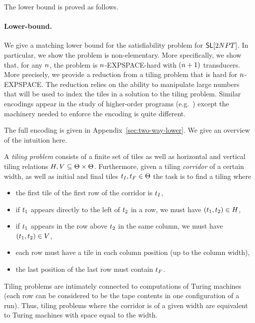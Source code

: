 The lower bound is proved as follows. 


\paragraph{Lower-bound.}

We give a matching lower bound for the satisfiability problem for $\mathsf{SL}[2NPT]$. 
In particular, we show the problem is non-elementary.
More specifically, we show that, for any $n$, the problem is $n$-EXPSPACE-hard with $(n+1)$ transducers. 
More precisely, we provide a  reduction from a tiling problem that is hard for $n$-EXPSPACE.
The reduction relies on the ability to manipulate large numbers that will be used to index the tiles in a solution to the tiling problem.
Similar encodings appear in the study of higher-order programs (e.g.~\cite{J01,CW07}) except the machinery needed to enforce the encoding is quite different.

The full encoding is given in 
          {Appendix~\ref{sec:two-way-lower}}.
We give an overview of the intuition here.

A \emph{tiling problem} consists of a finite set of tiles \tiles as well as horizontal and vertical tiling relations 
$H, V \subseteq \Theta \times \Theta$.
Furthermore, given a tiling \emph{corridor} of a certain width, as well as initial and final tiles
$t_I, t_F \in \Theta$
the task is to find a tiling where 
\begin{itemize}
\item
    the first tile of the first row of the corridor is $t_I$, 
\item
    if $t_1$ appears directly to the left of $t_2$ in a row, we must have
    $\left( t_1, t_2 \right) \in H$,
\item
    if $t_1$ appears in the row above $t_2$ in the same column, we must have
    $\left( t_1, t_2 \right) \in V$,
\item
    each row must have a tile in each column position (up to the column width),
\item
    the last position of the last row must contain $t_F$.
\end{itemize}
Tiling problems are intimately connected to computations of Turing machines 
(each row can be considered to be the tape contents in one configuration of a run).
Thus, tiling problems where the corridor is of a given width are equivalent to Turing machines with space equal to the width.

